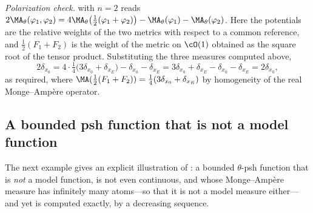 \begin{example}
\emph{Polarization check.}   with $n=2$ reads
$2\MA_\theta(\varphi_1,\varphi_2)
 =4\MA_\theta\bigl(\tfrac12(\varphi_1+\varphi_2)\bigr)
  -\MA_\theta(\varphi_1)-\MA_\theta(\varphi_2)$.
Here the potentials are the relative weights of the two metrics with respect
to a common reference, and
$\tfrac12(F_1+F_2)$ is the weight of the metric on $\cO(1)$ obtained as
the square root of the tensor product.  Substituting the three measures
computed above,
\[
 2\delta_{x_0}
 =4\cdot\tfrac14\bigl(3\delta_{x_0}+\delta_{x_E}\bigr)
  -\delta_{x_0}-\delta_{x_E}
 =3\delta_{x_0}+\delta_{x_E}-\delta_{x_0}-\delta_{x_E}
 =2\delta_{x_0},
\]
as required, where
$\MA(\tfrac12(F_1+F_2))=\tfrac14(3\delta_{x_0}+\delta_{x_E})$ by
homogeneity of the real Monge--Amp\`ere operator.
\end{example}

\subsection{A bounded psh function that is not a model function}
\label{sec:ch24-ex-branch}

The next example gives an explicit illustration of
: a bounded $\theta$-psh function that is
\emph{not} a model function, is not even continuous, and whose
Monge--Amp\`ere measure has infinitely many atoms---so that it is not a model
measure either---and yet is computed exactly, by a decreasing sequence.

